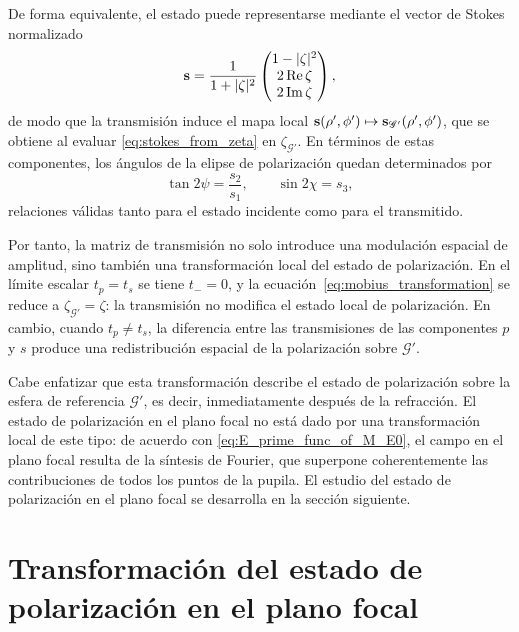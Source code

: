 De forma equivalente, el estado puede representarse mediante el vector de
Stokes normalizado
\begin{equation}
\vb s
=
\frac{1}{1+|\zeta|^2}
\begin{pmatrix}
1-|\zeta|^2 \\
2\operatorname{Re}\zeta \\
2\operatorname{Im}\zeta
\end{pmatrix},
\label{eq:stokes_from_zeta}
\end{equation}
de modo que la transmisión induce el mapa local
$\vb s(\rho',\phi') \mapsto \vb s_{\mathscr{G}'}(\rho',\phi')$, que se obtiene
al evaluar \eqref{eq:stokes_from_zeta} en $\zeta_{\mathscr{G}'}$. En términos
de estas componentes, los ángulos de la elipse de polarización quedan
determinados por
\begin{equation}
\tan 2\psi = \frac{s_2}{s_1},
\qquad
\sin 2\chi = s_3,
\label{eq:psi_chi_from_stokes}
\end{equation}
relaciones válidas tanto para el estado incidente como para el transmitido.

Por tanto, la matriz de transmisión no solo introduce una modulación espacial
de amplitud, sino también una transformación local del estado de polarización.
En el límite escalar $t_p=t_s$ se tiene $t_-=0$, y la
ecuación~\eqref{eq:mobius_transformation} se reduce a
$\zeta_{\mathscr{G}'}=\zeta$: la transmisión no modifica el estado local de
polarización. En cambio, cuando $t_p\neq t_s$, la diferencia entre las
transmisiones de las componentes $p$ y $s$ produce una redistribución espacial
de la polarización sobre $\mathscr{G}'$.

Cabe enfatizar que esta transformación describe el estado de polarización
sobre la esfera de referencia $\mathscr{G}'$, es decir, inmediatamente después
de la refracción. El estado de polarización en el plano focal no está dado por
una transformación local de este tipo: de acuerdo con
\eqref{eq:E_prime_func_of_M_E0}, el campo en el plano focal resulta de la
síntesis de Fourier, que superpone coherentemente las contribuciones de todos
los puntos de la pupila. El estudio del estado de polarización en el plano
focal se desarrolla en la sección siguiente.

\section{Transformación del estado de polarización en el plano focal}
\label{subsec:polarizacion_plano_focal}

